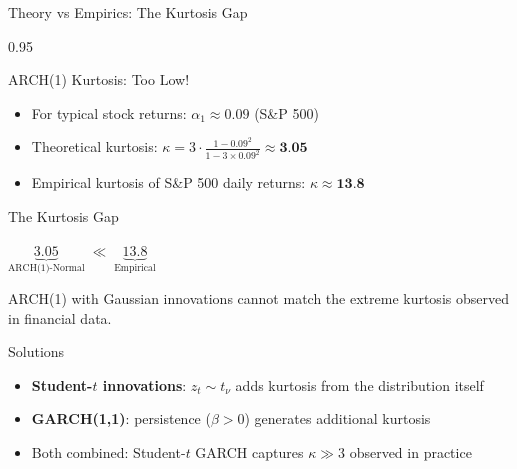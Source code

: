\documentclass[9pt, aspectratio=169, t]{beamer}
\begin{document}
\begin{frame}{Theory vs Empirics: The Kurtosis Gap}
    \begin{cminipage}{0.95\textwidth}
    \small
    \vspace{-0.2cm}
    \begin{block}{ARCH(1) Kurtosis: Too Low!}
        \begin{itemize}\setlength{\itemsep}{0pt}
            \item For typical stock returns: $\alpha_1 \approx 0.09$ (S\&P 500)
            \item Theoretical kurtosis: $\kappa = 3 \cdot \frac{1 - 0.09^2}{1 - 3 \times 0.09^2} \approx \textbf{3.05}$
            \item Empirical kurtosis of S\&P 500 daily returns: $\kappa \approx \textbf{13.8}$
        \end{itemize}
    \end{block}
    \vspace{-0.1cm}
    \begin{alertblock}{The Kurtosis Gap}
        \begin{center}
        {\large $\underbrace{3.05}_{\text{ARCH(1)-Normal}} \;\ll\; \underbrace{13.8}_{\text{Empirical}}$}
        \end{center}
        \vspace{-2mm}
        ARCH(1) with Gaussian innovations cannot match the extreme kurtosis observed in financial data.
    \end{alertblock}
    \vspace{-0.1cm}
    \begin{exampleblock}{Solutions}
        \begin{itemize}\setlength{\itemsep}{0pt}
            \item \textbf{Student-$t$ innovations}: $z_t \sim t_\nu$ adds kurtosis from the distribution itself
            \item \textbf{GARCH(1,1)}: persistence ($\beta > 0$) generates additional kurtosis
            \item Both combined: Student-$t$ GARCH captures $\kappa \gg 3$ observed in practice
        \end{itemize}
    \end{exampleblock}
    \end{cminipage}
\end{frame}

\end{document}
